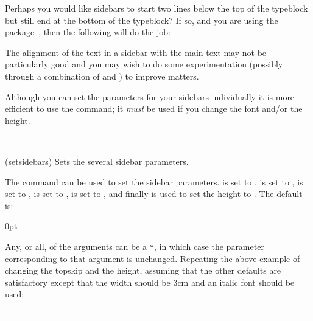     Perhaps you would like sidebars to start two lines below the top of
the typeblock but still end at the bottom of the typeblock? If so, and
you are using the  package~\cite{CALC}, then the following
will do the job:
\begin{lcode}
\setlength{\sidebartopskip}{2\onelineskip}
\setsidebarheight{\textheight-\sidebartopskip}
\end{lcode}


    The alignment of the text in a sidebar with the main text may not
be particularly good and you may wish to do some experimentation
(possibly through a combination of \lnc{\sidebarvsep} and 
\cmd{\setsidebarheight}) to improve matters.

    Although you can set the parameters for your sidebars individually it
is more efficient to use the \cmd{\setsidebars} command; it \emph{must} be 
used if you change the font and/or the height.
\begin{syntax}
\cmd{\setsidebars} \\
\end{syntax}
\glossary(setsidebars)%
  {}%
  {Sets the several sidebar parameters.}

The \cmd{\setsidebars} command can be used to set the sidebar parameters.
\lnc{\sidebarhsep} is set to , \lnc{\sidebarwidth} is set to
, \lnc{\sidebarvsep} is set to , \lnc{\sidebartopsep}
is set to , \cmd{\sidebarfont} is set to , 
and finally \cmd{\setsidebarheight} is used to set the height to .
The default is:
\begin{lcode}
\setsidebars{\marginparsep}{\marginparwidth}{\onelineskip}%
            {0pt}{\normalsize\normalfont}{\textheight}
\end{lcode}
Any, or all, of the arguments can be a \verb?*?, in which case the parameter
corresponding to that argument is unchanged. Repeating the above example of 
changing the topskip and the height, assuming that the other defaults are 
satisfactory except that the width should be 3cm and an italic font should 
be used:
\begin{lcode}
\setsidebars{*}{3cm}{*}{2\onelineskip}{\itshape}%
            {\textheight-\sidebartopsep}
\end{lcode}

